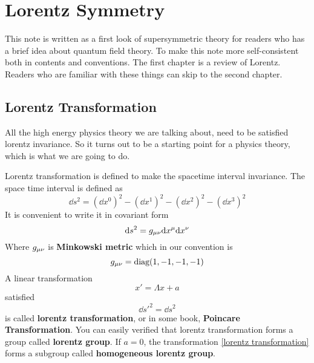 \chapter{Lorentz Symmetry}

This note is written as a first look of supersymmetric theory for readers who has a brief idea about quantum field theory. To make this note more self-consistent both in contents and conventions. The first chapter is a review of Lorentz.  Readers who are familiar with these things can skip to the second chapter.




\section{Lorentz Transformation}
   All the high energy physics theory we are talking about, need to be satisfied lorentz invariance. So it turns out to be a starting point for a physics theory, which is what we are going to do.
   
    Lorentz transformation is defined to make the spacetime interval invariance. The space time interval is defined as
   \begin{equation}
   \dd s^2 = (\dd x^0)^2-(\dd x^1)^2-(\dd x^2)^2-(\dd x^3)^2
   \end{equation}
   It is convenient to write it in covariant form 
   \begin{equation}
   \dd s^2 =g_{\mu\nu}\dd x^{\mu}\dd x^{\nu}
   \end{equation} 
   Where $g_{\mu\nu}$ is \textbf{Minkowski metric} which in our convention is
   \begin{equation}
   g_{\mu\nu} =\text{diag}(1,-1,-1,-1)
   \end{equation}
   A linear transformation 
   \begin{equation}\label{lorentz transformation}
   x' = \Lambda x + a 
   \end{equation}
   satisfied 
   \begin{equation}\label{lorentz invariance}
   \dd s'^2=\dd s^2
   \end{equation}
   is called \textbf{lorentz transformation}, or in some book, \textbf{Poincare Transformation}. You can easily verified that lorentz transformation forms a group called \textbf{lorentz group}. If $a = 0$, the transformation \eqref{lorentz transformation} forms a subgroup called \textbf{homogeneous lorentz group}.  
   
